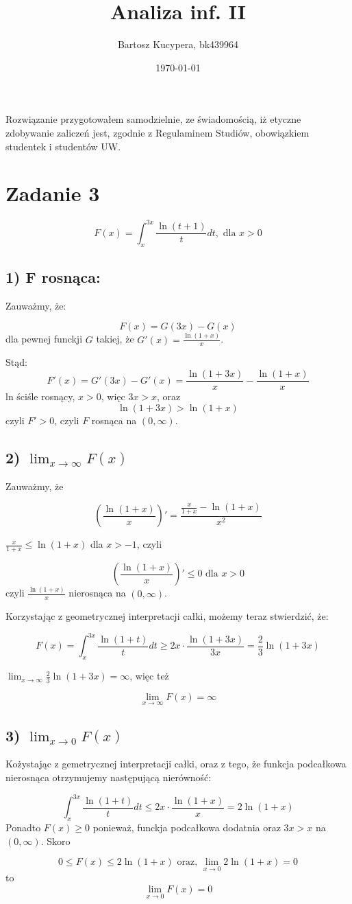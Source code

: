 \documentclass{article}
\title{Analiza inf. II}
\author{Bartosz Kucypera, bk439964}
\date{\today}
\begin{document}
\maketitle

Rozwiązanie przygotowałem samodzielnie, ze świadomością, iż etyczne zdobywanie zaliczeń jest, zgodnie z Regulaminem Studiów, obowiązkiem studentek i studentów UW.

\section*{Zadanie 3} 
$$ F(x) = \int_x^{3x} \frac{\ln(t+1)}{t}dt, \mbox{ dla } x>0 $$

\subsection*{1) F rosnąca:}
Zauważmy, że:

$$ F(x) = G(3x) - G(x) $$
dla pewnej funckji $G$ takiej, że $G'(x)=\frac{\ln(1+x)}{x}$. \newline 

Stąd: 
$$ F'(x) = G'(3x) - G'(x) = \frac{\ln(1+3x)}{x} - \frac{\ln(1+x)}{x} $$
ln ściśle rosnący, $x>0$, więc $3x>x$, oraz
$$ \ln(1+3x) > \ln(1+x) $$
czyli $F' > 0$, czyli $F$ rosnąca na $(0,\infty)$.

\subsection*{2) $\displaystyle \lim_{x \to \infty} F(x)$}
Zauważmy, że 

$$ \left( \frac{\ln(1+x)}{x} \right)' = \frac{\frac{x}{1+x} - \ln(1+x)}{x^2}$$

$\frac{x}{1+x} \le \ln(1+x)$ dla $x>-1$, czyli

$$ \left( \frac{\ln(1+x)}{x} \right)' \le 0 \mbox{ dla } x>0$$
czyli $\frac{\ln(1+x)}{x}$ nierosnąca na $(0,\infty)$.

Korzystając z geometrycznej interpretacji całki, możemy teraz stwierdzić, że:

$$ F(x) = \int_x^{3x} \frac{\ln(1+t)}{t}dt \ge 2x \cdot \frac{\ln(1+3x)}{3x} = \frac{2}{3}\ln(1+3x) $$

$\displaystyle \lim_{x \to \infty} \frac{2}{3} \ln(1+3x) = \infty$, więc też 

$$ \lim_{x \to \infty} F(x) = \infty $$

\newpage

\subsection*{3) $\displaystyle \lim_{x \to 0} F(x)$}
Kożystając z gemetrycznej interpretacji całki, oraz z tego, że funkcja podcałkowa nierosnąca otrzymujemy następującą nierówność:

$$ \int_x^{3x} \frac{\ln(1+t)}{t}dt \le 2x \cdot \frac{\ln(1+x)}{x} = 2\ln(1+x) $$
Ponadto $F(x) \ge 0$ ponieważ, funckja podcałkowa dodatnia oraz $3x > x$ na $(0, \infty)$. Skoro 

$$ 0 \le F(x) \le 2\ln(1+x) \mbox{ oraz, } \lim_{x \to 0} 2\ln(1+x) = 0$$
to
$$ \lim_{x \to 0} F(x) = 0 $$
\end{document}
